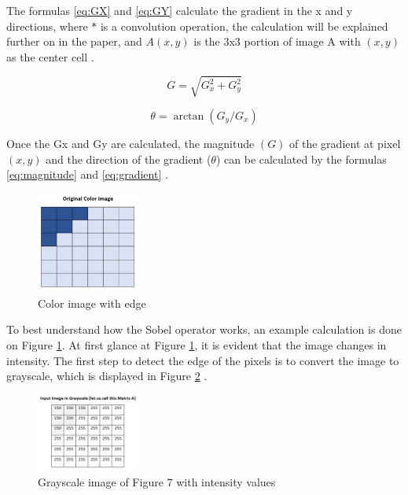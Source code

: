\documentclass[conference]{IEEEtran}
\begin{document}
The formulas \ref{eq:GX} and \ref{eq:GY} calculate the gradient in the x and y directions, where $*$ is a convolution operation, the calculation will be explained further on in the paper, and $A(x, y)$ is the 3x3 portion of image A with $(x,y)$ as the center cell \cite{b12}. 

\begin{equation}
    G = \sqrt{G_x^2 + G_y^2}
    \label{eq:magnitude}
\end{equation}

\begin{equation}
    \theta = \arctan(G_y/G_x)
    \label{eq:gradient}
\end{equation}

Once the Gx and Gy are calculated, the magnitude $(G)$ of the gradient at pixel $(x,y)$ and the direction of the gradient ($\theta$) can be calculated by the formulas \ref{eq:magnitude} and \ref{eq:gradient} \cite{b12}.

\begin{figure}[h]
    \centering
    \includegraphics[width=0.3\textwidth]{images/Picture10.png}
    \caption{Color image with edge \cite{b12}}
    \label{fig:Picture10}
    
\end{figure}

To best understand how the Sobel operator works, an example calculation is done on Figure \ref{fig:Picture10}. At first glance at Figure \ref{fig:Picture10}, it is evident that the image changes in intensity. The first step to detect the edge of the pixels is to convert the image to grayscale, which is displayed in Figure \ref{fig:Picture11} \cite{b12}.

\begin{figure}[h]
    \centering
    \includegraphics[width=0.3\textwidth]{images/Picture11.png}
    \caption{Grayscale image of Figure 7 with intensity values \cite{b12}}
    \label{fig:Picture11}
    
\end{figure}
\end{document}
